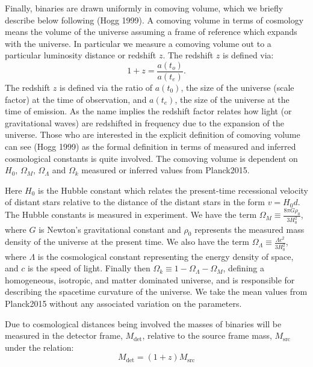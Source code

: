 Finally, binaries are drawn uniformly in comoving volume, which we briefly describe below following (Hogg 1999). A comoving volume in terms of cosmology means the volume of the universe assuming a frame of reference which expands with the universe. In particular we measure a comoving volume out to a particular luminosity distance or redshift $z$. The redshift $z$ is defined via:
\begin{equation}
    1 + z = \frac{a(t_o)}{a(t_e)}.
\end{equation}
The redshift $z$ is defined via the ratio of $a(t_0)$, the size of the universe (scale factor) at the time of observation, and $a(t_e)$, the size of the universe at the time of emission. As the name implies the redshift factor relates how light (or gravitational waves) are redshifted in frequency due to the expansion of the universe. Those who are interested in the explicit definition of comoving volume can see (Hogg 1999) as the formal definition in terms of measured and inferred cosmological constants is quite involved. The comoving volume is dependent on $H_0$, $\Omega_M$, $\Omega_\Lambda$ and $\Omega_k$ measured or inferred values from Planck2015.

Here $H_0$ is the Hubble constant which relates the present-time recessional velocity of distant stars relative to the distance of the distant stars in the form $v = H_0 d$. The Hubble constants is measured in experiment. We have the term $\Omega_M \equiv \frac{8 \pi G \rho_0}{3 H_0^2}$, where $G$ is Newton's gravitational constant and $\rho_0$ represents the measured mass density of the universe at the present time. We also have the term $\Omega_\Lambda \equiv \frac{\Lambda c^2}{3 H_0^2}$, where $\Lambda$ is the cosmological constant representing the energy density of space, and $c$ is the speed of light. Finally then $\Omega_k \equiv 1 - \Omega_\Lambda - \Omega_M$, defining a homogeneous, isotropic, and matter dominated universe, and is responsible for describing the spacetime curvature of the universe. We take the mean values from  Planck2015 without any associated variation on the parameters.

Due to cosmological distances being involved the masses of binaries will be measured in the detector frame, $M_\mathrm{det}$, relative to the source frame mass, $M_\mathrm{src}$ under the relation:
\begin{equation}
    M_\mathrm{det} = \left(1 + z \right) M_\mathrm{src}
\end{equation}

